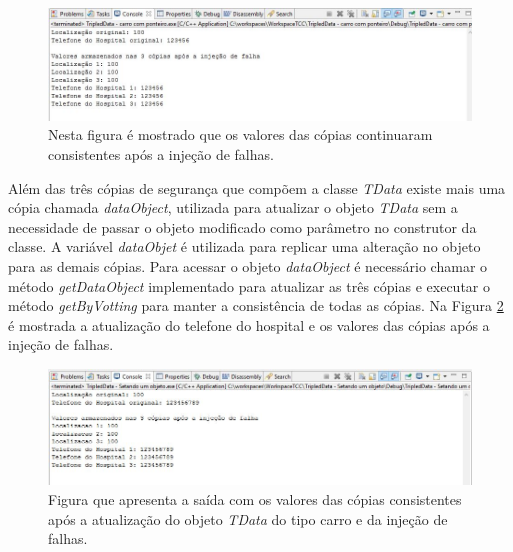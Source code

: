 \begin{figure}[H]
	\centering
	\includegraphics[width=1.0\textwidth]{figuras/tdataPonteiro.jpg}
	\caption[Valores das cópias consistentes após a injeção de falhas com ponteiro.]{Nesta figura é mostrado que os valores das cópias continuaram consistentes após a injeção de falhas.}
	\label{Img:tdataPonteiro}	
\end{figure}

Além das três cópias de segurança que compõem a classe \textit{TData} existe mais uma cópia chamada \textit{dataObject}, utilizada para atualizar o objeto \textit{TData} sem a necessidade de passar o objeto modificado como parâmetro no construtor da classe. A variável \textit{dataObjet} é utilizada para replicar uma alteração no objeto para as demais cópias. Para acessar o objeto \textit{dataObject} é necessário chamar o método \textit{getDataObject} implementado para atualizar as três cópias e executar o método \textit{getByVotting} para manter a consistência de todas as cópias. Na Figura \ref{Img:tdataSetando} é mostrada a atualização do telefone do hospital e os valores das cópias após a injeção de falhas.

\begin{figure}[H]
	\centering
	\includegraphics[width=1.0\textwidth]{figuras/tdataSetando.jpg}
	\caption[Figura que apresenta a saída com os valores das cópias consistentes após a atualização do objeto \textit{TData} do tipo carro e da injeção de falhas.]{Figura que apresenta a saída com os valores das cópias consistentes após a atualização do objeto \textit{TData} do tipo carro e da injeção de falhas.}
	\label{Img:tdataSetando}	
\end{figure}